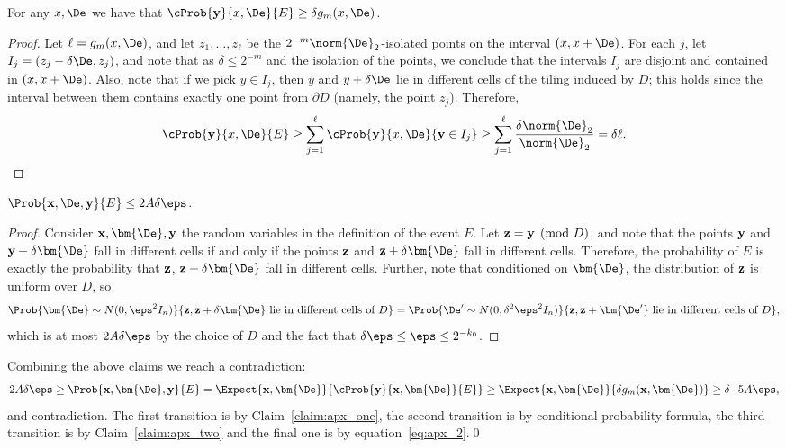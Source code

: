     \begin{claim}\label{claim:apx_one}
     For any $x,\De$ we have that $\cProb{{\bf y}}{x,\De}{E}\geq \delta g_m(x,\De)$.
    \end{claim}
    \begin{proof}
    Let $\ell = g_m(x,\De)$, and let $z_1,\ldots,z_{\ell}$ be the $2^{-m}\norm{\De}_2$-isolated points on the interval
    $(x,x+\De)$. For each $j$, let
    $I_j = (z_j - \delta\De,z_j)$, and note that as $\delta\leq 2^{-m}$ and the isolation of the points, we conclude that
    the intervals $I_j$ are disjoint and contained in $(x,x+\De)$.
    Also, note that if we pick $y\in I_j$, then $y$ and $y+\delta \De$ lie in different cells of the tiling induced by $D$;
    this holds since the interval between them contains exactly one point from $\partial D$ (namely, the point $z_j$). Therefore,
    \[
    \cProb{{\bf y}}{x,\De}{E}
    \geq\sum\limits_{j=1}^{\ell} \cProb{{\bf y}}{x,\De}{{\bf y}\in I_j}
    \geq\sum\limits_{j=1}^{\ell} \frac{\delta\norm{\De}_2}{\norm{\De}_2}
    =\delta\ell.\qedhere
    \]
    \end{proof}

   \begin{claim}\label{claim:apx_two}
     $\Prob{{\bf x},{\bf \De},{\bf y}}{E}\leq 2A\delta\eps$.
   \end{claim}
   \begin{proof}
      Consider ${\bf x},\bm{\De},{\bf y}$ the random variables in the definition of the event $E$. Let ${\bf z} = {\bf y}\pmod{D}$,
      and note that the points ${\bf y}$ and ${\bf y}+\delta\bm{\De}$ fall in different cells if and only if the points ${\bf z}$ and
      ${\bf z}+\delta\bm{\De}$ fall in different cells. Therefore, the probability of $E$ is exactly the probability that ${\bf z}$, ${\bf z}+\delta\bm{\De}$
      fall in different cells. Further, note that conditioned on $\bm{\De}$, the distribution of ${\bf z}$ is uniform over $D$, so
      \[
      \Prob{\bm{\De}\sim N(0,\eps^2 I_n)}{{\bf z}, {\bf z}+\delta\bm{\De}\text{ lie in different cells of } D}
      =\Prob{{\bf \De'}\sim N(0,\delta^2\eps^2 I_n)}{{\bf z}, {\bf z}+\bm{\De'}\text{ lie in different cells of }D},
      \]
      which is at most $2A\delta\eps$ by the choice of $D$ and the fact that $\delta\eps\leq \eps\leq 2^{-k_0}$.
    \end{proof}

    Combining the above claims we reach a contradiction:
    \[
    2A\delta\eps
    \geq
    \Prob{{\bf x},\bm{\De},{\bf y}}{E}
    =\Expect{{\bf x},\bm{\De}}{\cProb{{\bf y}}{{\bf x},\bm{\De}}{E}}
    \geq
    \Expect{{\bf x},\bm{\De}}{\delta g_m({\bf x},\bm{\De})}
    \geq \delta\cdot 5A\eps,
    \]
    and contradiction. The first transition is by Claim~\ref{claim:apx_one}, the second
    transition is by conditional probability formula, the third transition is by Claim~\ref{claim:apx_two}
    and the final one is by equation~\eqref{eq:apx_2}.\qed

















